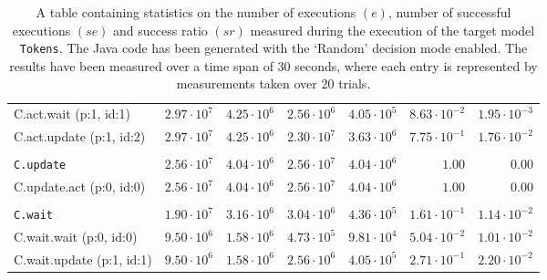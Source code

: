 \begin{table}[htbp]
{\begin{tabular}{lrrrrrr}
\hspace{3mm}C.act.wait (p:1, id:1)    & $2.97 \cdot 10^{7}$ & $4.25 \cdot 10^{6}$ & $2.56 \cdot 10^{6}$ & $4.05 \cdot 10^{5}$ & $8.63 \cdot 10^{-2}$ & $1.95 \cdot 10^{-3}$ \\
\hspace{3mm}C.act.update (p:1, id:2)  & $2.97 \cdot 10^{7}$ & $4.25 \cdot 10^{6}$ & $2.30 \cdot 10^{7}$ & $3.63 \cdot 10^{6}$ & $7.75 \cdot 10^{-1}$ & $1.76 \cdot 10^{-2}$ \\
\\[-8pt]\texttt{C.update}             & $2.56 \cdot 10^{7}$ & $4.04 \cdot 10^{6}$ & $2.56 \cdot 10^{7}$ & $4.04 \cdot 10^{6}$ &               $1.00$ &               $0.00$ \\
\hspace{3mm}C.update.act (p:0, id:0)  & $2.56 \cdot 10^{7}$ & $4.04 \cdot 10^{6}$ & $2.56 \cdot 10^{7}$ & $4.04 \cdot 10^{6}$ &               $1.00$ &               $0.00$ \\
\\[-8pt]\texttt{C.wait}               & $1.90 \cdot 10^{7}$ & $3.16 \cdot 10^{6}$ & $3.04 \cdot 10^{6}$ & $4.36 \cdot 10^{5}$ & $1.61 \cdot 10^{-1}$ & $1.14 \cdot 10^{-2}$ \\
\hspace{3mm}C.wait.wait (p:0, id:0)   & $9.50 \cdot 10^{6}$ & $1.58 \cdot 10^{6}$ & $4.73 \cdot 10^{5}$ & $9.81 \cdot 10^{4}$ & $5.04 \cdot 10^{-2}$ & $1.01 \cdot 10^{-2}$ \\
\hspace{3mm}C.wait.update (p:1, id:1) & $9.50 \cdot 10^{6}$ & $1.58 \cdot 10^{6}$ & $2.56 \cdot 10^{6}$ & $4.05 \cdot 10^{5}$ & $2.71 \cdot 10^{-1}$ & $2.20 \cdot 10^{-2}$ \\
\bottomrule
\end{tabular}
}
\caption{A table containing statistics on the number of executions $(e)$, number of successful executions $(se)$ and success ratio $(sr)$ measured during the execution of the target model \texttt{Tokens}. The Java code has been generated with the `Random' decision mode enabled. The results have been measured over a time span of 30 seconds, where each entry is represented by measurements taken over 20 trials.}
\label{table:frequency_results_tokens_random}
\end{table}